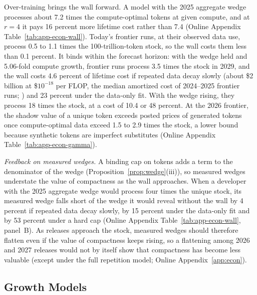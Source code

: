 Over-training brings the wall forward. A model with the 2025 aggregate wedge processes about 7.2 times the
compute-optimal tokens at given compute, and at $r=4$ it pays 16 percent more lifetime cost rather than 7.4 (Online
Appendix Table~\ref{tab:app-econ-wall}). Today's frontier runs, at their observed data use, process 0.5 to 1.1 times the
100-trillion-token stock, so the wall costs them less than 0.1 percent. It binds within the forecast horizon: with the
wedge held and 5.06-fold compute growth, frontier runs process 3.5 times the stock in 2029, and the wall costs 4.6
percent of lifetime cost if repeated data decay slowly (about \$2 billion at \$$10^{-18}$ per FLOP, the median amortized
cost of 2024--2025 frontier runs; \citealp{epochai2026data}) and 23 percent under the data-only fit. With the wedge
rising, they process 18 times the stock, at a cost of 10.4 or 48 percent. At the 2026 frontier, the shadow value of a
unique token exceeds posted prices of generated tokens \citep{deepseek2026pricing} once compute-optimal data exceed 1.5
to 2.9 times the stock, a lower bound because synthetic tokens are imperfect substitutes (Online Appendix
Table~\ref{tab:app-econ-gamma}).

\textit{Feedback on measured wedges.} A binding cap on tokens adds a term to the denominator of the wedge
(Proposition~\ref{prop:wedge}(iii)), so measured wedges understate the value of compactness as the wall approaches. When
a developer with the 2025 aggregate wedge would process four times the unique stock, its measured wedge falls short of
the wedge it would reveal without the wall by 4 percent if repeated data decay slowly, by 15 percent under the data-only
fit and by 53 percent under a hard cap (Online Appendix Table~\ref{tab:app-econ-wall}, panel~B). As releases approach
the stock, measured wedges should therefore flatten even if the value of compactness keeps rising, so a flattening among
2026 and 2027 releases would not by itself show that compactness has become less valuable (except under the
full repetition model; Online Appendix~\ref{app:econ}).



\subsection{Growth Models}\label{sec:econ-growth}

